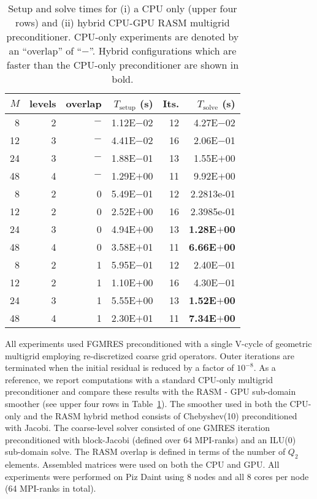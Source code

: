 \documentclass[]{siamart0216}
\begin{document}
\begin{table}[h!]
\centering
\caption{Setup and solve times for (i) a CPU only (upper four rows) and (ii) hybrid CPU-GPU RASM multigrid preconditioner. 
CPU-only experiments are denoted by an ``overlap''  of ``$-$''. Hybrid configurations which are faster than the CPU-only preconditioner 
are shown in bold.
}
\begin{tabular}{r r r r r r}
\toprule
$M$    &levels     &overlap     &$T_\text{setup}$ (s) &Its. &$T_\text{solve}$ (s)\\
\toprule
8	&2		&$-$			&1.12E$-$02		&12	&4.27E$-$02 \\
12	&3		&$-$			&4.41E$-$02		&16	&2.06E$-$01 \\
24	&3		&$-$			&1.88E$-$01		&13	&1.55E$+$00 \\
48	&4		&$-$			&1.29E$+$00		&11	&9.92E$+$00  \\
\midrule
\midrule
8	&2		&0			&5.49E$-$01		&12	&2.2813e-01 \\
12	&2		&0			&2.52E$+$00		&16	&2.3985e-01 \\
24	&3		&0			&4.94E$+$00		&13	&\textbf{1.28E$+$00} \\
48	&4		&0			&3.58E$+$01		&11	&\textbf{6.66E$+$00} \\
\midrule
8	&2		&1			&5.95E$-$01		&12	&2.40E$-$01  \\
12	&2		&1			&1.10E$+$00		&16	&4.30E$-$01  \\
24	&3		&1			&5.55E$+$00		&13	&\textbf{1.52E$+$00} \\
48	&4		&1			&2.30E$+$01		&11	&\textbf{7.34E$+$00} \\
\bottomrule
\end{tabular}
\label{tab:MGtelescopeASM}
\end{table}

All experiments used FGMRES preconditioned with a single V-cycle of geometric multigrid 
employing re-discretized coarse grid operators. 
Outer iterations are terminated when the initial residual is reduced by a factor of $10^{-8}$.
As a reference, we report computations with a standard CPU-only multigrid preconditioner and compare these results with 
the RASM - GPU sub-domain smoother (see upper four rows in Table~\ref{tab:MGtelescopeASM}).
The smoother used in both the CPU-only and the RASM hybrid method consists of Chebyshev(10) preconditioned with Jacobi.
The coarse-level solver consisted of one GMRES iteration preconditioned with block-Jacobi (defined over 64 MPI-ranks) and an
ILU(0) sub-domain solve. 
The RASM overlap is defined in terms of the number of $Q_2$ elements.
Assembled matrices were used on both the CPU and GPU.
All experiments were performed on Piz Daint using 8 nodes and all 8 cores per node (64 MPI-ranks in total).
\end{document}
